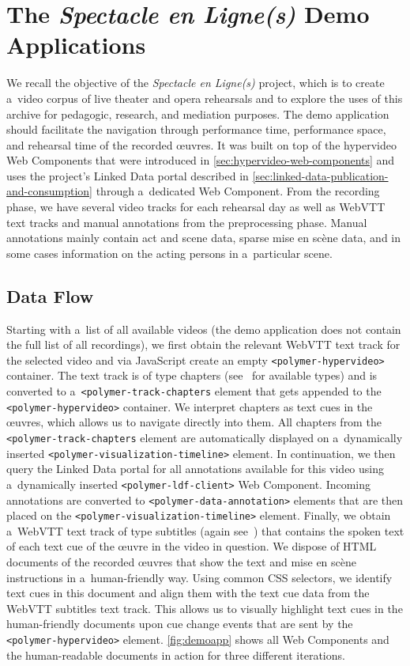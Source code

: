 \documentclass[runningheads,a4paper]{llncs}
\begin{document}
\section{The \emph{Spectacle en Ligne(s)} Demo Applications}

We recall the objective of the \emph{Spectacle en Ligne(s)} project,
which  is to create a~video corpus of live theater and opera rehearsals
and to explore the uses of this archive for pedagogic, research, and mediation purposes.
The demo application should facilitate the navigation through performance time,
performance space, and rehearsal time of the recorded œuvres.
It was built on top of the hypervideo Web Components
that were introduced in \autoref{sec:hypervideo-web-components}
and uses the project's Linked Data portal described in
\autoref{sec:linked-data-publication-and-consumption} through a~dedicated Web Component.
From the recording phase, we have several video tracks for each rehearsal day
as well as WebVTT text tracks and manual annotations from the preprocessing phase.
Manual annotations mainly contain act and scene data, sparse mise en scène data,
and in some cases information on the acting persons in a~particular scene.

\subsection{Data Flow}

Starting with a~list of all available videos
(the demo application does not contain the full list of all recordings),
we first obtain the relevant WebVTT text track for the selected video
and via JavaScript create an empty \texttt{<polymer-hypervideo>} container.
The text track is of type chapters (see~\cite{pfeiffer2013webvtt} for available types)
and is converted to a~\texttt{<polymer-track-chapters} element
that gets appended to the \texttt{<polymer-hypervideo>} container.
We interpret chapters as text cues in the œuvres, which allows us to navigate directly into them.
All chapters from the \texttt{<polymer-track-chapters} element are automatically displayed
on a~dynamically inserted \texttt{<polymer-visualization-timeline>} element.
In continuation, we then query the Linked Data portal for all annotations available for this video
using a~dynamically inserted \texttt{<polymer-ldf-client>} Web Component.
Incoming annotations are converted to \texttt{<polymer-data-annotation>} elements
that are then placed on the \texttt{<polymer-visualization-timeline>} element.
Finally, we obtain a~WebVTT text track of type subtitles (again see~\cite{pfeiffer2013webvtt})
that contains the spoken text of each text cue of the œuvre in the video in question.
We dispose of HTML documents of the recorded œuvres
that show the text and mise en scène instructions in a~human-friendly way.
Using common CSS selectors, we identify text cues in this document and align them
with the text cue data from the WebVTT subtitles text track.
This allows us to visually highlight text cues in the human-friendly documents
upon cue change events that are sent by the \texttt{<polymer-hypervideo>} element.
\autoref{fig:demoapp} shows all Web Components and the human-readable documents in action
for three different iterations.
\end{document}
